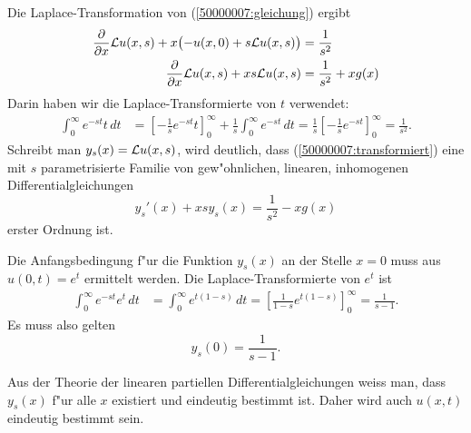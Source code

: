 \begin{loesung}
\begin{teilaufgaben}
\item
Die Laplace-Transformation von (\ref{50000007:gleichung}) ergibt
\begin{align}
\frac{\partial}{\partial x}{\cal L}u(x,s)
+x\bigl(-u(x,0)+s{\cal L}u(x,s)\bigr)&=\frac1{s^2}
\notag
\\
\frac{\partial}{\partial x}{\cal L}u(x,s)
+xs{\cal L}u(x,s)&=\frac1{s^2}+xg(x)
\label{50000007:transformiert}
\end{align}
Darin haben wir die Laplace-Transformierte von $t$ verwendet:
\begin{align*}
\int_0^\infty e^{-st}t\,dt
&=
\left[
-\frac1{s} e^{-st}t
\right]_0^\infty
+\frac1s\int_0^\infty e^{-st}\,dt
=\frac1s\left[
-\frac1se^{-st}
\right]_0^\infty=\frac1{s^2}.
\end{align*}
Schreibt man $y_s(x)={\cal L}u(x,s)$, wird deutlich,
dass (\ref{50000007:transformiert}) eine mit $s$ parametrisierte
Familie von gew"ohnlichen, linearen, inhomogenen Differentialgleichungen
\begin{equation}
y_s'(x)+xsy_s(x)=\frac1{s^2}-xg(x)
\label{50000007:family}
\end{equation}
erster Ordnung ist.

Die Anfangsbedingung f"ur die Funktion $y_s(x)$ an der Stelle $x=0$
muss aus $u(0,t)=e^t$ ermittelt werden.
Die Laplace-Transformierte von $e^t$ ist
\begin{align*}
\int_0^\infty e^{-st}e^t\,dt
&=
\int_0^\infty e^{t(1-s)}\,dt
=\left[\frac1{1-s}e^{t(1-s)}\right]_0^\infty=\frac1{s-1}.
\end{align*}
Es muss also gelten
\[
y_s(0)=\frac1{s-1}.
\]
\item
Aus der Theorie der linearen partiellen Differentialgleichungen weiss man,
dass $y_s(x)$ f"ur alle $x$ existiert und eindeutig bestimmt ist. 
Daher wird auch $u(x,t)$ eindeutig bestimmt sein.


\end{teilaufgaben}
\end{loesung}
